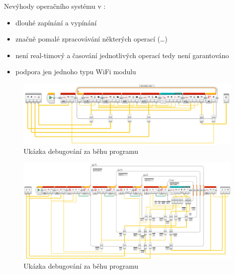 Nevýhody operačního systému v :  %
\begin{itemize}[noitemsep]\itemsep2pt
	\item dlouhé zapínání a vypínání
	\item značně pomalé zpracovávání některých operací (\dots) %
	\item není real-timový a časování jednotlivých operací tedy není garantováno
	\item podpora jen jednoho typu WiFi modulu
\end{itemize}
% 
% 
%
%
%
%
%
%
%
%
%
%
\begin{figure}[h]
	\centering
	\includegraphics[width=\textwidth]{images/lego-soft/lego-soft_legolib_converge_array.png}
	\caption{Ukázka debugování za běhu programu}
	\label{fig:lego-soft_live-debuging_line-advance}
\end{figure}
\begin{figure}[h]
	\centering
	\includegraphics[width=\textwidth]{images/lego-soft/lego-soft_legolib_match_array_length.png}
	\caption{Ukázka debugování za běhu programu}
	\label{fig:lego-soft_live-debuging_line-advance}
\end{figure}



